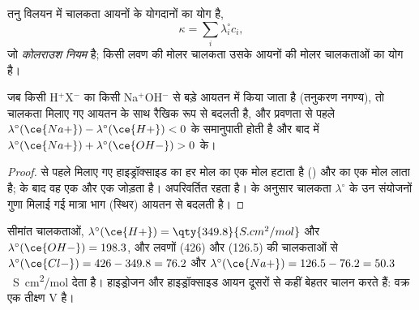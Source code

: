 \begin{proposition}[कोलराउश नियम]\label{prop:b1:titration-methods:kohlrausch}
तनु विलयन में चालकता आयनों के योगदानों का
योग है,
\[
  \kappa = \sum_i \lambda_i^\circ c_i ,
\]
जो \emph{कोलराउश नियम} है; किसी लवण की मोलर चालकता
उसके आयनों की मोलर चालकताओं का योग है।
\end{proposition}


\begin{proposition}\label{prop:b1:titration-methods:conductimetric-slopes}
जब किसी  H$^+$X$^-$ का किसी 
Na$^+$OH$^-$ से बड़े आयतन में  किया जाता है (तनुकरण नगण्य), तो चालकता
मिलाए गए आयतन के साथ रैखिक रूप से बदलती है, और प्रवणता  से पहले
$\lambda^\circ(\ce{Na+}) - \lambda^\circ(\ce{H+}) < 0$ के समानुपाती होती है
और बाद में $\lambda^\circ(\ce{Na+}) + \lambda^\circ(\ce{OH-}) > 0$ के।
\end{proposition}

\begin{proof}
 से पहले मिलाए गए हाइड्रॉक्साइड का हर मोल  का एक मोल हटाता है
() और  का एक मोल लाता है;  के
बाद वह एक  और एक  जोड़ता है।  अपरिवर्तित रहता है।
 के अनुसार चालकता $\lambda^\circ$ के उन संयोजनों गुणा
मिलाई गई मात्रा भाग (स्थिर) आयतन से बदलती है।
\end{proof}

सीमांत चालकताओं, $\lambda^\circ(\ce{H+}) =
\qty{349.8}{S.cm^2/mol}$ और $\lambda^\circ(\ce{OH-}) = 198.3$, और
लवणों  (426) और  (126.5) की चालकताओं से 
$\lambda^\circ(\ce{Cl-}) = 426 - 349.8 = 76.2$ और $\lambda^\circ(\ce{Na+}) =
126.5 - 76.2 = 50.3$~\unit{S.cm^2/mol} देता है। हाइड्रोजन और हाइड्रॉक्साइड आयन
दूसरों से कहीं बेहतर चालन करते हैं: वक्र एक तीक्ष्ण V है।


